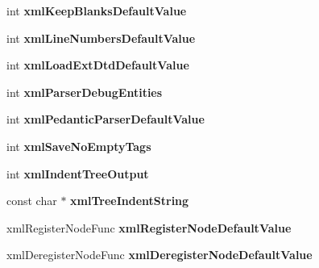 \begin{DoxyCompactItemize}
\mbox{\label{struct__xml_global_state_aafbd2893936cc7e0b906277bf4476f26}} 
int {\bfseries xml\+Keep\+Blanks\+Default\+Value}
\item 
\mbox{\label{struct__xml_global_state_a60edc1852ca27c7910919b2b0813f0f8}} 
int {\bfseries xml\+Line\+Numbers\+Default\+Value}
\item 
\mbox{\label{struct__xml_global_state_a5372304342b0799d753b848b4ff797f2}} 
int {\bfseries xml\+Load\+Ext\+Dtd\+Default\+Value}
\item 
\mbox{\label{struct__xml_global_state_ab1de5b17ba7c598ab79b3f842f017c26}} 
int {\bfseries xml\+Parser\+Debug\+Entities}
\item 
\mbox{\label{struct__xml_global_state_aed754d7889fb431e0d9623660db32ea3}} 
int {\bfseries xml\+Pedantic\+Parser\+Default\+Value}
\item 
\mbox{\label{struct__xml_global_state_a2e91a726bfc9552958e60c867ebb4a7b}} 
int {\bfseries xml\+Save\+No\+Empty\+Tags}
\item 
\mbox{\label{struct__xml_global_state_a321904b6d88296e892ebe7120aa62ace}} 
int {\bfseries xml\+Indent\+Tree\+Output}
\item 
\mbox{\label{struct__xml_global_state_aaa0df8b1a4d5a8fbcdde46d286e78625}} 
const char $\ast$ {\bfseries xml\+Tree\+Indent\+String}
\item 
\mbox{\label{struct__xml_global_state_a30d6034926e4292ce0feec490008c568}} 
xml\+Register\+Node\+Func {\bfseries xml\+Register\+Node\+Default\+Value}
\item 
\mbox{\label{struct__xml_global_state_a7dd29e256c9eeb78789c6f483bd4098b}} 
xml\+Deregister\+Node\+Func {\bfseries xml\+Deregister\+Node\+Default\+Value}
\item 
\mbox{\label{struct__xml_global_state_ab2b37c13cce8ccc8a7bb0e0a47474563}} 

\end{DoxyCompactItemize}

